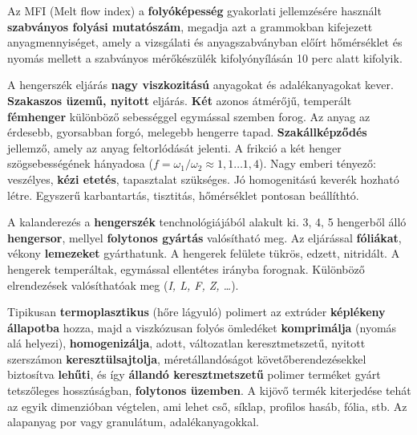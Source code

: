 \documentclass[12pt,a4paper]{article}       %
\begin{document}
\begin{tcbitemize}
  \tcbitem[title={\# \thetcbrasternum{} –
        Mi az MFI?
      }]
  Az MFI (Melt flow index) a \textbf{folyóképesség} gyakorlati jellemzésére
  használt \textbf{szabványos folyási mutatószám}, megadja azt a grammokban
  kifejezett anyagmennyiséget, amely a vizsgálati és anyagszabványban előírt
  hőmérséklet és nyomás mellett a szabványos mérőkészülék kifolyónyílásán
  10 perc alatt kifolyik.



  \tcbitem[title={\# \thetcbrasternum{} –
        Mi a hengerszék?
      }]
  A hengerszék eljárás \textbf{nagy viszkozitású} anyagokat és adalékanyagokat
  kever. \textbf{Szakaszos üzemű, nyitott} eljárás. \textbf{Két} azonos
  átmérőjű, temperált \textbf{fémhenger} különböző sebességgel egymással
  szemben forog. Az anyag az érdesebb, gyorsabban forgó, melegebb hengerre
  tapad. \textbf{Szakállképződés} jellemző, amely az anyag feltorlódását
  jelenti. A frikció a két henger szögsebességének hányadosa ($f = \omega_1 /
    \omega_2 \approx 1,1 \dots 1,4$). Nagy emberi tényező: veszélyes,
  \textbf{kézi etetés}, tapasztalat szükséges. Jó homogenitású keverék hozható
  létre. Egyszerű karbantartás, tisztitás, hőmérséklet pontosan beállíthtó.



  \tcbitem[title={\# \thetcbrasternum{} –
        Mi a kalander?
      }]
  A kalanderezés a \textbf{hengerszék} tenchnológiájából alakult ki. 3, 4, 5
  hengerből álló \textbf{hengersor}, mellyel \textbf{folytonos gyártás}
  valósítható meg. Az eljárással \textbf{fóliákat}, vékony \textbf{lemezeket}
  gyárthatunk. A hengerek felülete tükrös, edzett, nitridált. A hengerek
  temperáltak, egymással ellentétes irányba forognak. Különböző elrendezések
  valósíthatóak meg (\textit{I, L, F, Z, \dots}).



  \tcbitem[title={\# \thetcbrasternum{} –
        Mi az extrúzió?
      }]
  Tipikusan \textbf{termoplasztikus} (hőre lágyuló) polimert az extrúder
  \textbf{képlékeny állapotba} hozza, majd a viszkózusan folyós ömledéket
  \textbf{komprimálja} (nyomás alá helyezi), \textbf{homogenizálja}, adott,
  változatlan keresztmetszetű, nyitott szerszámon \textbf{keresztülsajtolja},
  méretállandóságot követőberendezésekkel biztosítva \textbf{lehűti}, és így
  \textbf{állandó keresztmetszetű} polimer terméket gyárt tetszőleges
  hosszúságban, \textbf{folytonos üzemben}. A kijövő termék kiterjedése tehát
  az egyik dimenzióban végtelen, ami lehet cső, síklap, profilos hasáb, fólia,
  stb. Az alapanyag por vagy granulátum, adalékanyagokkal.




\end{tcbitemize}
\end{document}

